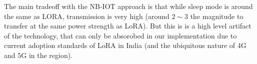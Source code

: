 The main tradeoff with the NB-IOT approach is that while sleep mode is around the same as LORA, transmission is very high (around $2\sim3$ the magnitude to transfer at the same power strength as LoRA). But this is is a high level artifact of the technology, that can only be absorobed in our implementation due to current adoption standards of LoRA in India (and the ubiquitous nature of 4G and 5G in the region).






